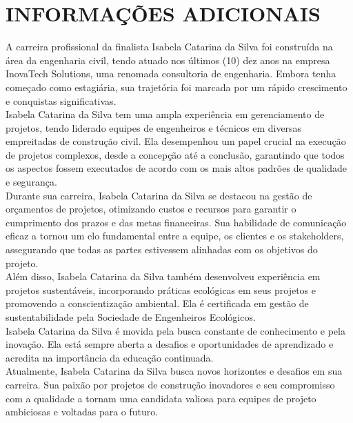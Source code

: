 \documentclass[10.5pt, a4paper]{report}
\begin{document}
\section{INFORMAÇÕES ADICIONAIS}
A carreira profissional da finalista Isabela Catarina da Silva foi construída na área da engenharia civil, tendo atuado nos últimos (10) dez anos na empresa InovaTech Solutions, uma renomada consultoria de engenharia. Embora tenha começado como estagiária, sua trajetória foi marcada por um rápido crescimento e conquistas significativas.\\Isabela Catarina da Silva tem uma ampla experiência em gerenciamento de projetos, tendo liderado equipes de engenheiros e técnicos em diversas empreitadas de construção civil. Ela desempenhou um papel crucial na execução de projetos complexos, desde a concepção até a conclusão, garantindo que todos os aspectos fossem executados de acordo com os mais altos padrões de qualidade e segurança.\\Durante sua carreira, Isabela Catarina da Silva se destacou na gestão de orçamentos de projetos, otimizando custos e recursos para garantir o cumprimento dos prazos e das metas financeiras. Sua habilidade de comunicação eficaz a tornou um elo fundamental entre a equipe, os clientes e os stakeholders, assegurando que todas as partes estivessem alinhadas com os objetivos do projeto.\\Além disso, Isabela Catarina da Silva também desenvolveu experiência em projetos sustentáveis, incorporando práticas ecológicas em seus projetos e promovendo a conscientização ambiental. Ela é certificada em gestão de sustentabilidade pela Sociedade de Engenheiros Ecológicos.\\Isabela Catarina da Silva é movida pela busca constante de conhecimento e pela inovação. Ela está sempre aberta a desafios e oportunidades de aprendizado e acredita na importância da educação continuada.\\Atualmente, Isabela Catarina da Silva busca novos horizontes e desafios em sua carreira. Sua paixão por projetos de construção inovadores e seu compromisso com a qualidade a tornam uma candidata valiosa para equipes de projeto ambiciosas e voltadas para o futuro.
\end{document}
